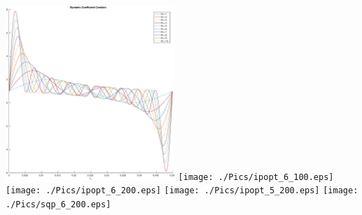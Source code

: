 \documentclass{article}
\begin{document}
\includegraphics[width=0.48\textwidth]{./Pics/Dynamic_Coefficient_Creation.eps}
\clearpage%
\texttt{[image: ./Pics/ipopt\_6\_100.eps]}
\clearpage%
\texttt{[image: ./Pics/ipopt\_6\_200.eps]}
\clearpage%
\texttt{[image: ./Pics/ipopt\_5\_200.eps]}
\clearpage%
\texttt{[image: ./Pics/sqp\_6\_200.eps]}
\clearpage%
\end{document}
